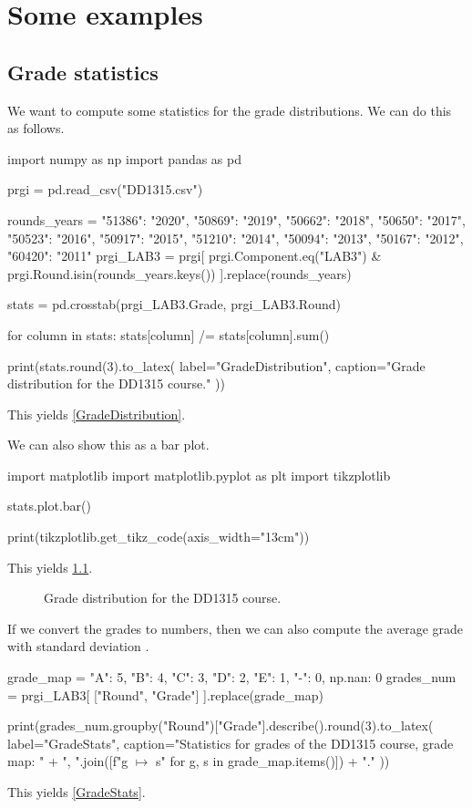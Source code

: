 \mode*

\chapter{Some examples}

\section{Grade statistics}

We want to compute some statistics for the grade distributions.
We can do this as follows.
\begin{pyblock}[statstest][numbers=left]
import numpy as np
import pandas as pd

prgi = pd.read_csv("DD1315.csv")

rounds_years = {
  "51386": "2020",
  "50869": "2019",
  "50662": "2018",
  "50650": "2017",
  "50523": "2016",
  "50917": "2015",
  "51210": "2014",
  "50094": "2013",
  "50167": "2012",
  "60420": "2011"
}
prgi_LAB3 = prgi[
  prgi.Component.eq("LAB3") & prgi.Round.isin(rounds_years.keys())
].replace(rounds_years)

stats = pd.crosstab(prgi_LAB3.Grade, prgi_LAB3.Round)

for column in stats:
  stats[column] /= stats[column].sum()

print(stats.round(3).to_latex(
  label="GradeDistribution",
  caption="Grade distribution for the DD1315 course."
))
\end{pyblock}
This yields \cref{GradeDistribution}.

\stdoutpythontex

We can also show this as a bar plot.
\begin{pyblock}[statstest][numbers=left,firstnumber=last]
import matplotlib
import matplotlib.pyplot as plt
import tikzplotlib

stats.plot.bar()

print(tikzplotlib.get_tikz_code(axis_width="13cm"))
\end{pyblock}
This yields \cref{GradeDistributionFig}.

\begin{figure}
  \centering
  \stdoutpythontex
  \caption{Grade distribution for the DD1315 course.}
  \label{GradeDistributionFig}
\end{figure}

If we convert the grades to numbers, then we can also compute the average grade 
with standard deviation \etc.
\begin{pyblock}[statstest][numbers=left,firstnumber=last]
grade_map = {
  "A": 5, "B": 4, "C": 3, "D": 2, "E": 1, "-": 0, np.nan: 0
}
grades_num = prgi_LAB3[ ["Round", "Grade"] ].replace(grade_map)

print(grades_num.groupby("Round")["Grade"].describe().round(3).to_latex(
  label="GradeStats",
  caption="Statistics for grades of the DD1315 course, grade map: " +
    ", ".join([f"{g} $\mapsto$ {s}" for g, s in grade_map.items()]) + "."
))
\end{pyblock}
This yields \cref{GradeStats}.

